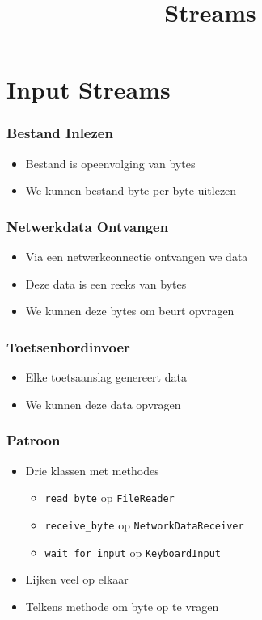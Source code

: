 \documentclass[dutch]{ucll-slides}
\title{Streams}
\begin{document}
\maketitle

\section{Input Streams}

\frame{\tableofcontents[currentsection]}

\begin{frame}
  \frametitle{Bestand Inlezen}
  \begin{itemize}
    \item Bestand is opeenvolging van bytes
    \item We kunnen bestand byte per byte uitlezen
  \end{itemize}
\end{frame}

\begin{frame}
  \frametitle{Netwerkdata Ontvangen}
  \begin{itemize}
    \item Via een netwerkconnectie ontvangen we data
    \item Deze data is een reeks van bytes
    \item We kunnen deze bytes om beurt opvragen
  \end{itemize}
\end{frame}

\begin{frame}
  \frametitle{Toetsenbordinvoer}
  \begin{itemize}
    \item Elke toetsaanslag genereert data
    \item We kunnen deze data opvragen
  \end{itemize}
\end{frame}

\begin{frame}
  \frametitle{Patroon}
  \begin{itemize}
    \item Drie klassen met methodes
          \begin{itemize}
            \item \texttt{read\_byte} op \texttt{FileReader}
            \item \texttt{receive\_byte} op \texttt{NetworkDataReceiver}
            \item \texttt{wait\_for\_input} op \texttt{KeyboardInput}
          \end{itemize}
    \item Lijken veel op elkaar
    \item Telkens methode om byte op te vragen
  \end{itemize}
\end{frame}
\end{document}
